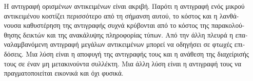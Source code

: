 \begin{greek}
Η αντιγραφή ορισμένων αντικειμένων είναι ακριβή. Παρότι η
αντιγραφή ενός μικρού αντικειμένου κοστίζει περισσότερο από
τη σήμανση αυτού, το κόστος και η λανθάνουσα καθυστέρηση της
αντιγραφής συχνά κρύβονται από το κόστος της παρακολούθησης
δεικτών και της ανακάλυψης πληροφορίας τύπων. Από την άλλη
πλευρά η επαναλαμβανόμενη αντιγραφή μεγάλων αντικειμένων μπορεί
να οδηγήσει σε φτωχές επιδόσεις. Μια λύση είναι η αποφυγή
της αντιγραφής τους και η ανάθεση της διαχείρισής τους σε
έναν μη μετακινούντα συλλέκτη. Μια άλλη λύση είναι η αντιγραφή
τους να πραγματοποιείται εικονικά και όχι φυσικά.

\end{greek}
